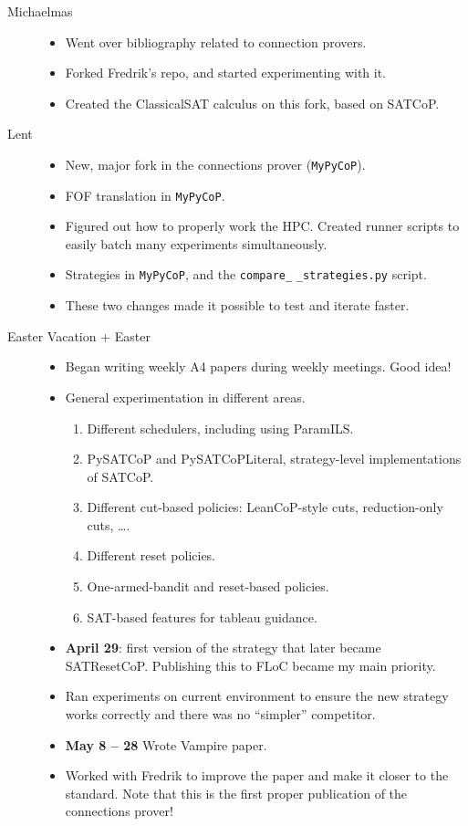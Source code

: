 \documentclass[twocolumn,10pt,a4paper]{article}
\newcommand{\mypycop}{\texttt{MyPyCoP}}
\newcommand{\pop}{\phantom{a}}
\newcommand{\cop}[1]{\textsf{#1}}
\begin{document}
\begin{description}
	\item[Michaelmas] \pop{}
		\begin{itemize}[label=---]
			\item Went over bibliography related to connection provers.
			\item Forked Fredrik's repo, and started experimenting with it.
			\item Created the \cop{ClassicalSAT} calculus on this fork, based on SATCoP\cite{eliminatingModels}.
		\end{itemize}
	\item[Lent] \pop{}
		\begin{itemize}[label=---]
			\item New, major fork in the connections prover (\mypycop{}).
			\item FOF translation in \mypycop{}.
			\item Figured out how to properly work the HPC. Created runner scripts to easily batch many experiments simultaneously.
			\item Strategies in \mypycop{}, and the \texttt{compare\_} \texttt{\_strategies.py} script.
			\item These two changes made it possible to test and iterate faster.
		\end{itemize}
	\item[Easter Vacation + Easter] \pop{}
		\begin{itemize}[label=---]
			\item Began writing weekly A4 papers during weekly meetings. Good idea!
			\item General experimentation in different areas.
				\begin{enumerate}
					\item Different schedulers, including using ParamILS\cite{hutterParamILSAutomaticAlgorithm2009}.
					\item \cop{PySATCoP} and \cop{PySATCoPLiteral}, strategy-level implementations of \cop{SATCoP}.
					\item Different cut-based policies: LeanCoP-style cuts, reduction-only cuts, \dots{}.
					\item Different reset policies.
					\item One-armed-bandit and reset-based policies.
					\item SAT-based features for tableau guidance.
				\end{enumerate}
			\item \textbf{April 29}: first version of the strategy that later became \cop{SATResetCoP}. Publishing this to FLoC became my main priority.
			\item Ran experiments on current environment to ensure the new strategy works correctly and there was no ``simpler'' competitor.
			\item \textbf{May 8 -- 28} Wrote Vampire paper.
			\item Worked with Fredrik to improve the paper and make it closer to the standard. Note that this is the first proper publication of the connections prover\cite{connections_2023}!
		\end{itemize}
\end{description}
\end{document}
